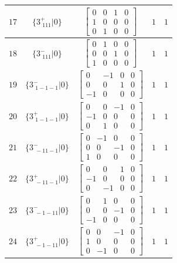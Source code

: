 \documentclass[fleqn,8pt]{jsarticle}
\begin{document}
\begin{longtable}{ccccc}
$ 17 $ & $ \{3^{+}_{\,\,111}|0\} $ & $ \begin{bmatrix} 0 & 0 & 1 & 0 \\ 1 & 0 & 0 & 0 \\ 0 & 1 & 0 & 0 \end{bmatrix} $ & $ 1 $ & $ 1 $ \\ \hline
$ 18 $ & $ \{3^{-}_{\,\,111}|0\} $ & $ \begin{bmatrix} 0 & 1 & 0 & 0 \\ 0 & 0 & 1 & 0 \\ 1 & 0 & 0 & 0 \end{bmatrix} $ & $ 1 $ & $ 1 $ \\ \hline
$ 19 $ & $ \{3^{-}_{\,\,1-1-1}|0\} $ & $ \begin{bmatrix} 0 & -1 & 0 & 0 \\ 0 & 0 & 1 & 0 \\ -1 & 0 & 0 & 0 \end{bmatrix} $ & $ 1 $ & $ 1 $ \\ \hline
$ 20 $ & $ \{3^{+}_{\,\,1-1-1}|0\} $ & $ \begin{bmatrix} 0 & 0 & -1 & 0 \\ -1 & 0 & 0 & 0 \\ 0 & 1 & 0 & 0 \end{bmatrix} $ & $ 1 $ & $ 1 $ \\ \hline
$ 21 $ & $ \{3^{-}_{\,\,-11-1}|0\} $ & $ \begin{bmatrix} 0 & -1 & 0 & 0 \\ 0 & 0 & -1 & 0 \\ 1 & 0 & 0 & 0 \end{bmatrix} $ & $ 1 $ & $ 1 $ \\ \hline
$ 22 $ & $ \{3^{+}_{\,\,-11-1}|0\} $ & $ \begin{bmatrix} 0 & 0 & 1 & 0 \\ -1 & 0 & 0 & 0 \\ 0 & -1 & 0 & 0 \end{bmatrix} $ & $ 1 $ & $ 1 $ \\ \hline
$ 23 $ & $ \{3^{-}_{\,\,-1-11}|0\} $ & $ \begin{bmatrix} 0 & 1 & 0 & 0 \\ 0 & 0 & -1 & 0 \\ -1 & 0 & 0 & 0 \end{bmatrix} $ & $ 1 $ & $ 1 $ \\ \hline
$ 24 $ & $ \{3^{+}_{\,\,-1-11}|0\} $ & $ \begin{bmatrix} 0 & 0 & -1 & 0 \\ 1 & 0 & 0 & 0 \\ 0 & -1 & 0 & 0 \end{bmatrix} $ & $ 1 $ & $ 1 $ \\
\end{longtable}
\end{document}
